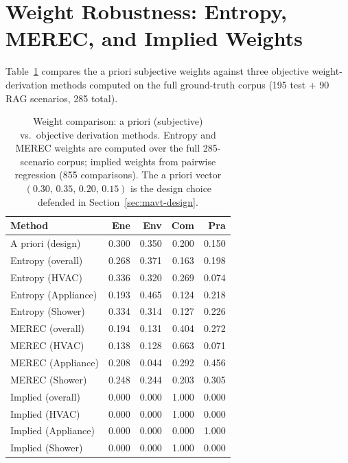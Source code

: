 \documentclass[a4paper,fleqn]{cas-dc}
\begin{document}
\section{Weight Robustness: Entropy, MEREC, and Implied Weights}
\label{app:weights}

Table~\ref{tab:weight_comparison} compares the a priori subjective weights
against three objective weight-derivation methods computed on the full
ground-truth corpus (195 test + 90 RAG scenarios, 285 total).

\begin{table}[t]
\small
\centering
\renewcommand{\arraystretch}{1.15}
\caption{Weight comparison: a priori (subjective) vs.\ objective
derivation methods. Entropy and MEREC weights are computed over the
full 285-scenario corpus; implied weights from pairwise regression
(855 comparisons). The a priori vector
$(0.30,\,0.35,\,0.20,\,0.15)$ is the design choice defended in
Section~\ref{sec:mavt-design}.}
\label{tab:weight_comparison}
\begin{tabular}{@{}l rrrr@{}}
\toprule
\textbf{Method} & Ene & Env & Com & Pra \\
\midrule
A priori (design)         & 0.300 & 0.350 & 0.200 & 0.150 \\
Entropy (overall)         & 0.268 & 0.371 & 0.163 & 0.198 \\
Entropy (HVAC)            & 0.336 & 0.320 & 0.269 & 0.074 \\
Entropy (Appliance)       & 0.193 & 0.465 & 0.124 & 0.218 \\
Entropy (Shower)          & 0.334 & 0.314 & 0.127 & 0.226 \\
\midrule
MEREC (overall)           & 0.194 & 0.131 & 0.404 & 0.272 \\
MEREC (HVAC)              & 0.138 & 0.128 & 0.663 & 0.071 \\
MEREC (Appliance)         & 0.208 & 0.044 & 0.292 & 0.456 \\
MEREC (Shower)            & 0.248 & 0.244 & 0.203 & 0.305 \\
\midrule
Implied (overall)         & 0.000 & 0.000 & 1.000 & 0.000 \\
Implied (HVAC)            & 0.000 & 0.000 & 1.000 & 0.000 \\
Implied (Appliance)       & 0.000 & 0.000 & 0.000 & 1.000 \\
Implied (Shower)          & 0.000 & 0.000 & 1.000 & 0.000 \\
\bottomrule
\end{tabular}
\renewcommand{\arraystretch}{1.0}
\end{table}
\end{document}
